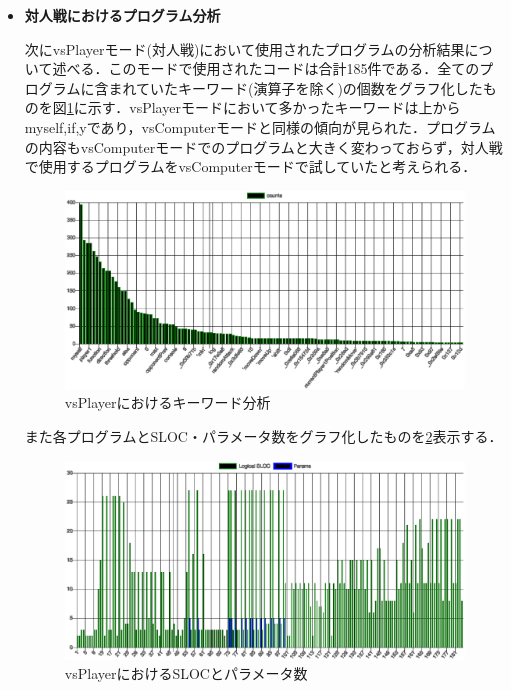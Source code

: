 \begin{itemize}
  \item {\bf 対人戦におけるプログラム分析}

  次にvsPlayerモード(対人戦)において使用されたプログラムの分析結果について述べる．このモードで使用されたコードは合計185件である．全てのプログラムに含まれていたキーワード(演算子を除く)の個数をグラフ化したものを図\ref{vsPlayer_keyword}に示す．vsPlayerモードにおいて多かったキーワードは上からmyself,if,yであり，vsComputerモードと同様の傾向が見られた．プログラムの内容もvsComputerモードでのプログラムと大きく変わっておらず，対人戦で使用するプログラムをvsComputerモードで試していたと考えられる．

  \begin{figure}[!ht]
    \begin{center}
      \includegraphics[width=1.0\linewidth]{image/vsPlayer_result.eps}
    \end{center}
      \vspace{-8mm} 
    \caption{vsPlayerにおけるキーワード分析}
    \label{vsPlayer_keyword}
  \end{figure}

  また各プログラムとSLOC・パラメータ数をグラフ化したものを\ref{vsPlayer_sloc_and_params}表示する．

  \begin{figure}[!ht]
    \begin{center}
      \includegraphics[width=1.0\linewidth]{image/vsPlayer_escomplex_SLOC_params.eps}
    \end{center}
      \vspace{-8mm} 
    \caption{vsPlayerにおけるSLOCとパラメータ数}
    \label{vsPlayer_sloc_and_params}
  \end{figure}


\end{itemize}
